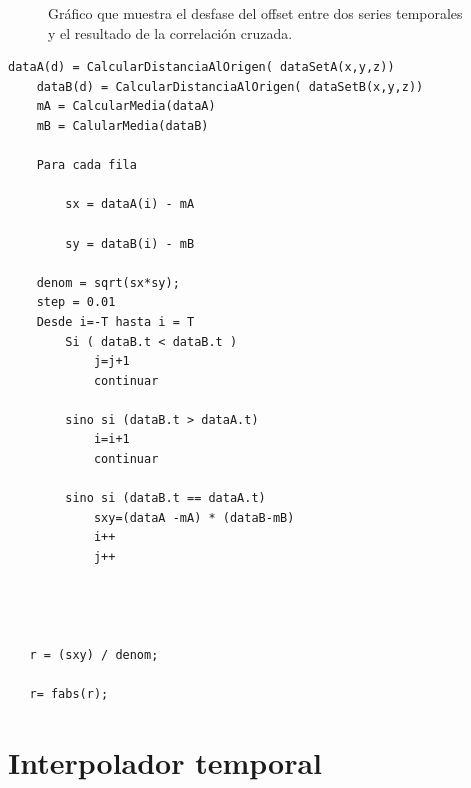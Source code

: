 \begin{figure}[H]
\begin{center}
\hspace{0.5cm}

\end{center}

\caption{Gráfico que muestra el desfase del offset entre dos series temporales y el resultado de la correlación cruzada.}
\end{figure}
	                                
	\begin{lstlisting}[frame=single]
	dataA(d) = CalcularDistanciaAlOrigen( dataSetA(x,y,z))
	dataB(d) = CalcularDistanciaAlOrigen( dataSetB(x,y,z))
	mA = CalcularMedia(dataA)
	mB = CalularMedia(dataB)

	Para cada fila

   		sx = dataA(i) - mA

   		sy = dataB(i) - mB

   	denom = sqrt(sx*sy);
   	step = 0.01
   	Desde i=-T hasta i = T
   		Si ( dataB.t < dataB.t )
			j=j+1
    		continuar

    	sino si (dataB.t > dataA.t)
    		i=i+1
    		continuar

    	sino si (dataB.t == dataA.t)
    		sxy=(dataA -mA) * (dataB-mB)
        	i++
        	j++


   

   r = (sxy) / denom;

   r= fabs(r);
    \end{lstlisting}



\section{Interpolador temporal}

